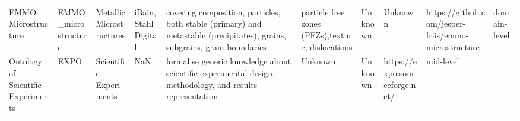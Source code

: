 \begin{tabular}{m{5cm}m{2cm}m{5cm}m{2cm}m{2cm}m{2cm}m{2cm}m{2cm}m{2cm}}
                                                              EMMO Microstructure &     EMMO_microstructure &                    Metallic Microstructures &                                                                                                                                                                                                                                                                                                                                                  iBain, StahlDigital &                                                                                                                                                                                                                           covering composition, particles, both stable (primary) and metastable (precipitates), grains, subgrains, grain boundaries & particle free zones (PFZs),texture, dislocations &                                                                                                            Unknown &                                      Unknown &                                               https://github.com/jesper-friis/emmo-microstructure  &      domain-level \\
                                               Ontology of Scientific Experiments &                    EXPO &                      Scientific Experiments &                                                                                                                                                                                                                                                                                                                                                                  NaN &                                                                                                                                                                                                                                                                                              formalise generic knowledge about scientific experimental design, methodology, and results representation &                                                                                                            Unknown &                                      Unknown &                                                                      https://expo.sourceforge.net/ &         mid-level \\

\end{tabular}
